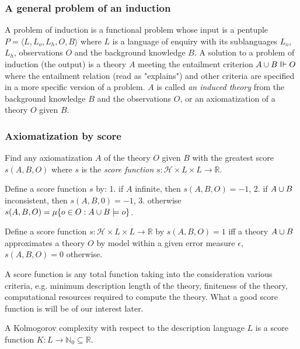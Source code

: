 \subsubsection{A general problem of an induction}
A problem of induction is a functional problem whose input is a pentuple $P=\langle L, L_o, L_h, O, B\rangle$ where $L$ is a language of enquiry with its sublanguages $L_o$, $L_h$, observations $O$ and the background knowledge $B$. A solution to a problem of induction (the output) is a theory $A$ meeting the entailment criterion
$A \cup B \Vvdash O$ where the entailment relation (read as "explains") and other criteria are specified in a more specific version of a problem.
$A$ is called \emph{an induced theory} from the background knowledge $B$ and the observations $O$, or an axiomatization of a theory $O$ given $B$.

\subsubsection{Axiomatization by score}
Find any axiomatization $A$ of the theory $O$ given $B$ with the greatest score $s(A,B,O)$ where $s$ is the \emph{score function}
$s:\mathcal{H} \times L \times L \to \mathbb{R}$.

\begin{exmp}
Define a score function $s$ by:
1. if $A$ infinite, then $s(A,B,O)=-1$,
2. if $A \cup B$ inconsistent, then $s(A,B,0)=-1$,
3. otherwise $s(A,B,O)=\mu\{o \in O : A \cup B \models o\}$.
\end{exmp}

\begin{exmp}
Define a score function $s:\mathcal{H} \times L \times L \to \mathbb{R}$ by $s(A,B,O)=1$ iff a theory $A \cup B$ approximates a theory $O$ by model within a given error measure $\epsilon$, $s(A,B,O)=0$ otherwise.
\end{exmp}

\begin{note}
A score function is any total function taking into the consideration various criteria, e.g. minimum description length of the theory, finiteness of the theory, computational resources required to compute the theory. What a good score function is will be of our interest later.
\end{note}

\begin{exmp}
A Kolmogorov complexity with respect to the description language $L$ is a score function $K:L \to \mathbb{N}_0 \subseteq \mathbb{R}$.
\end{exmp}

